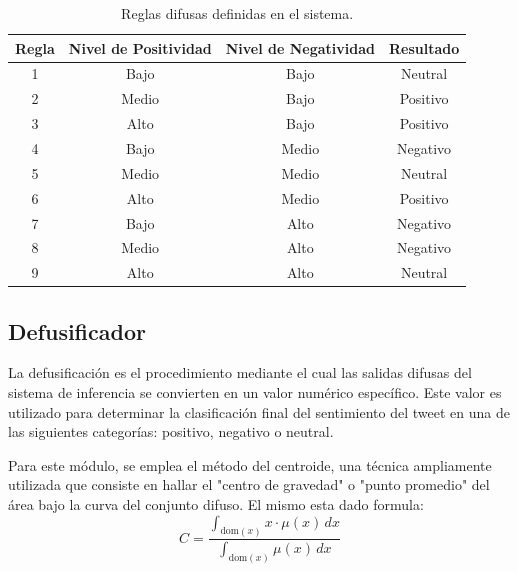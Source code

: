 \documentclass[sigconf, review=false, nonacm]{acmart}
\begin{document}
\begin{table}[h!]
	\centering
	\begin{tabular}{|c|c|c|c|}
		\hline
		\textbf{Regla} & \textbf{Nivel de Positividad} & \textbf{Nivel de Negatividad} & \textbf{Resultado} \\ \hline
		1              & Bajo                          & Bajo                          & Neutral            \\ \hline
		2              & Medio                         & Bajo                          & Positivo           \\ \hline
		3              & Alto                          & Bajo                          & Positivo           \\ \hline
		4              & Bajo                          & Medio                         & Negativo           \\ \hline
		5              & Medio                         & Medio                         & Neutral            \\ \hline
		6              & Alto                          & Medio                         & Positivo           \\ \hline
		7              & Bajo                          & Alto                          & Negativo           \\ \hline
		8              & Medio                         & Alto                          & Negativo           \\ \hline
		9              & Alto                          & Alto                          & Neutral            \\ \hline
	\end{tabular}
	\caption{Reglas difusas definidas en el sistema.}
	\label{table:reglas_difusas}
\end{table}

\subsection{Defusificador}
La defusificación es el procedimiento mediante el cual las salidas difusas del sistema de inferencia se
convierten en un valor numérico específico. Este valor es utilizado para determinar la clasificación final del
sentimiento del tweet en una de las siguientes categorías: positivo, negativo o neutral.

Para este módulo, se emplea el método del centroide, una técnica ampliamente utilizada que consiste en hallar
el "centro de gravedad" o "punto promedio" del área bajo la curva del conjunto difuso. El mismo esta dado
formula:
$$
	C = \frac{\int_{\text{dom}(x)} x \cdot \mu(x) \, dx}{\int_{\text{dom}(x)} \mu(x) \, dx}
$$
\end{document}
